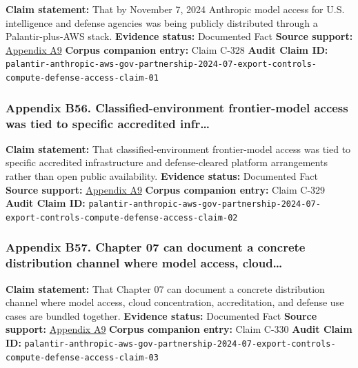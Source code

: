 \documentclass[
  american,
  11pt,
  letterpaper,
]{article}
\begin{document}
\textbf{Claim statement:} That by November 7, 2024 Anthropic model
access for U.S. intelligence and defense agencies was being publicly
distributed through a Palantir-plus-AWS stack. \textbf{Evidence status:}
Documented Fact \textbf{Source support:}
\hyperref[ch-08-appendix-a9-anthropic-and-palantir-partner-to-bring-claude-ai-models-to-aws-for-u-s-government-intelligence-and-defense-operations]{Appendix
A9} \textbf{Corpus companion entry:} Claim C-328 \textbf{Audit Claim
ID:}
\texttt{palantir-anthropic-aws-gov-partnership-2024-07-export-controls-compute-defense-access-claim-01}

\subsubsection{Appendix B56. Classified-environment frontier-model
access was tied to specific accredited
infr\ldots{}}\label{ch-08-appendix-b56-classified-environment-frontier-model-access-was-tied-to-specific-accredited-infr}

\textbf{Claim statement:} That classified-environment frontier-model
access was tied to specific accredited infrastructure and
defense-cleared platform arrangements rather than open public
availability. \textbf{Evidence status:} Documented Fact \textbf{Source
support:}
\hyperref[ch-08-appendix-a9-anthropic-and-palantir-partner-to-bring-claude-ai-models-to-aws-for-u-s-government-intelligence-and-defense-operations]{Appendix
A9} \textbf{Corpus companion entry:} Claim C-329 \textbf{Audit Claim
ID:}
\texttt{palantir-anthropic-aws-gov-partnership-2024-07-export-controls-compute-defense-access-claim-02}

\subsubsection{Appendix B57. Chapter 07 can document a concrete
distribution channel where model access,
cloud\ldots{}}\label{ch-08-appendix-b57-chapter-07-can-document-a-concrete-distribution-channel-where-model-access-cloud}

\textbf{Claim statement:} That Chapter 07 can document a concrete
distribution channel where model access, cloud concentration,
accreditation, and defense use cases are bundled together.
\textbf{Evidence status:} Documented Fact \textbf{Source support:}
\hyperref[ch-08-appendix-a9-anthropic-and-palantir-partner-to-bring-claude-ai-models-to-aws-for-u-s-government-intelligence-and-defense-operations]{Appendix
A9} \textbf{Corpus companion entry:} Claim C-330 \textbf{Audit Claim
ID:}
\texttt{palantir-anthropic-aws-gov-partnership-2024-07-export-controls-compute-defense-access-claim-03}
\end{document}
